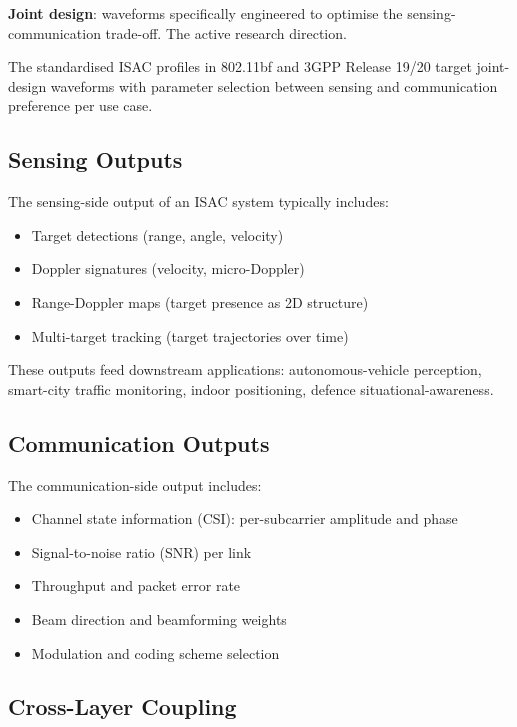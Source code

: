 \documentclass[sigconf,nonacm]{acmart}
\begin{document}
\textbf{Joint design}: waveforms specifically engineered to
optimise the sensing-communication trade-off. The active research
direction.

The standardised ISAC profiles in 802.11bf and 3GPP Release 19/20
target joint-design waveforms with parameter selection between
sensing and communication preference per use case.

\subsection{Sensing Outputs}

The sensing-side output of an ISAC system typically includes:

\begin{itemize}
  \item Target detections (range, angle, velocity)
  \item Doppler signatures (velocity, micro-Doppler)
  \item Range-Doppler maps (target presence as 2D structure)
  \item Multi-target tracking (target trajectories over time)
\end{itemize}

These outputs feed downstream applications: autonomous-vehicle
perception, smart-city traffic monitoring, indoor positioning,
defence situational-awareness.

\subsection{Communication Outputs}

The communication-side output includes:

\begin{itemize}
  \item Channel state information (CSI): per-subcarrier
        amplitude and phase
  \item Signal-to-noise ratio (SNR) per link
  \item Throughput and packet error rate
  \item Beam direction and beamforming weights
  \item Modulation and coding scheme selection
\end{itemize}

\subsection{Cross-Layer Coupling}
\end{document}

